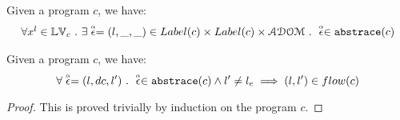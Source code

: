 %
\begin{lem}
  \label{lem:absevent_unique}
Given a program ${c}$, we have:
%
\[
  \begin{array}{l}
    \forall x^l \in \mathbb{LV}_c ~.~
\exists \stackrel{\scriptscriptstyle{\alpha}}{\mathtt{\epsilon}{}} = (l, \_, \_) \in Label(c) \times Label(c) \times \mathcal{ADOM} ~.~ 
\stackrel{\scriptscriptstyle{\alpha}}{\mathtt{\epsilon}{}} \in \mathtt{abs}{\mathtt{trace}}(c)
\end{array}
\]
\end{lem}
%
%
\begin{lem}
  \label{lem:flow_to_absflow}
Given a program ${c}$, we have:
%
\[
\forall \stackrel{\scriptscriptstyle{\alpha}}{\mathtt{\epsilon}{}} = (l, dc, l') ~.~ 
\stackrel{\scriptscriptstyle{\alpha}}{\mathtt{\epsilon}{}} \in \mathtt{abs}{\mathtt{trace}}(c) \land l' \neq l_e
\implies (l, l') \in flow(c)
\]
\end{lem}
\begin{proof}
  This is proved trivially by induction on the program $c$.
\end{proof}
